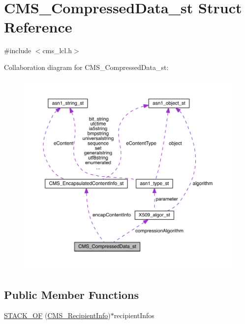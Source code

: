 \hypertarget{struct_c_m_s___compressed_data__st}{}\section{C\+M\+S\+\_\+\+Compressed\+Data\+\_\+st Struct Reference}
\label{struct_c_m_s___compressed_data__st}


{\ttfamily \#include $<$cms\+\_\+lcl.\+h$>$}



Collaboration diagram for C\+M\+S\+\_\+\+Compressed\+Data\+\_\+st\+:\nopagebreak
\begin{figure}[H]
\begin{center}
\leavevmode
\includegraphics[width=350pt]{struct_c_m_s___compressed_data__st__coll__graph}
\end{center}
\end{figure}
\subsection*{Public Member Functions}
\begin{DoxyCompactItemize}
\item 
\hyperlink{struct_c_m_s___compressed_data__st_a8119f9ab1b20c31bc1dbb8365f0325eb}{S\+T\+A\+C\+K\+\_\+\+OF} (\hyperlink{crypto_2cms_2cms_8h_ac5c9066f9d23a39dc973dd8821304756}{C\+M\+S\+\_\+\+Recipient\+Info})$\ast$recipient\+Infos
\end{DoxyCompactItemize}
